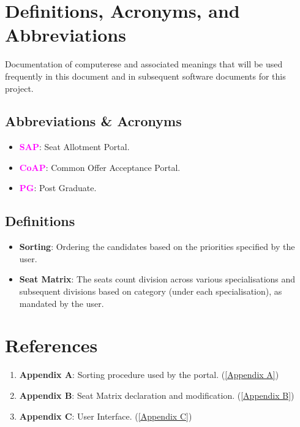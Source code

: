 \documentclass{report}
\begin{document}
\section{Definitions, Acronyms, and Abbreviations}
Documentation of computerese and associated meanings that will be used frequently in this document and in subsequent software documents for this project.
\subsection{Abbreviations \& Acronyms}
\begin{itemize}
    \item \textbf{\textcolor{magenta}{SAP}}: Seat Allotment Portal.
    \item \textbf{\textcolor{magenta}{CoAP}}: Common Offer Acceptance Portal.
    \item \textbf{\textcolor{magenta}{PG}}: Post Graduate.
\end{itemize}
\subsection{Definitions}
\begin{itemize}
    \item \textbf{Sorting}: Ordering the candidates based on the priorities specified by the user.
    \item \textbf{Seat Matrix}: The seats count division across various specialisations and subsequent divisions based on category (under each specialisation), as mandated by the user.
\end{itemize}
\section{References}
\begin{enumerate}
    \item \textbf{Appendix A}: Sorting procedure used by the portal. (\ref{Appendix A})
    \item \textbf{Appendix B}: Seat Matrix declaration and modification. (\ref{Appendix B})
    \item \textbf{Appendix C}: User Interface. (\ref{Appendix C})
\end{enumerate}
\newpage
\end{document}
